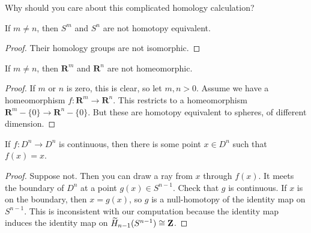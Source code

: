Why should you care about this complicated homology calculation?
\begin{corollary}
If $m\neq n$, then $S^m$ and $S^n$ are not homotopy equivalent.
\end{corollary}
\begin{proof}
Their homology groups are not isomorphic.
\end{proof}
\begin{corollary}
If $m\neq n$, then $\mathbf{R}^m$ and $\mathbf{R}^n$ are not homeomorphic.
\end{corollary}
\begin{proof}
If $m$ or $n$ is zero, this is clear, so 
let $m,n>0$. Assume we have a homeomorphism $f:\mathbf{R}^m\to \mathbf{R}^n$. This restricts to a homeomorphism $\mathbf{R}^m-\{0\}\to \mathbf{R}^n-\{0\}$.
But these are homotopy equivalent to spheres, of different dimension.
\end{proof}
\begin{theorem}
If $f:D^n\to D^n$ is continuous, 
then there is some point $x\in D^n$ such that $f(x)=x$.
\end{theorem}
\begin{proof}
Suppose not. Then you can draw a ray from $x$ through $f(x)$. It meets the boundary of $D^n$ at a point $g(x)\in S^{n-1}$. Check that $g$ is continuous. If $x$ is on the boundary, then $x=g(x)$, so $g$ is a null-homotopy of the identity map on $S^{n-1}$. This is inconsistent with our computation because the identity map induces the identity map on $\widetilde H_{n-1}(S^{n-1})\cong\mathbf Z$.
\end{proof}



